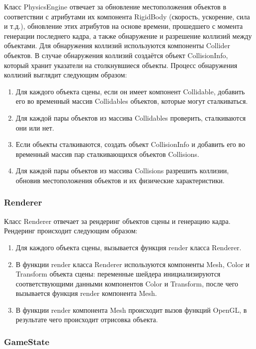 Класс PhysicsEngine отвечает за обновление местоположения объектов в соответствии с атрибутами их компонента RigidBody (скорость, ускорение, сила и т.д.), обновление этих атрибутов на основе времени, прошедшего с момента генерации последнего кадра, а также обнаружение и разрешение коллизий между объектами.
Для обнаружения коллизий используются компоненты Collider объектов.
В случае обнаружения коллизий создаётся объект CollisionInfo, который хранит указатели на столкнувшиеся объекты.
Процесс обнаружения коллизий выглядит следующим образом:
\begin{enumerate}
    \item Для каждого объекта сцены, если он имеет компонент Collidable, добавить его во временный массив Collidables объектов, которые могут сталкиваться.
    \item Для каждой пары объектов из массива Collidables проверить, сталкиваются они или нет.
    \item Если объекты сталкиваются, создать объект CollisionInfo и добавить его во временный массив пар сталкивающихся объектов Collisions.
    \item Для каждой пары объектов из массива Collisions разрешить коллизии, обновив местоположения объектов и их физические характеристики.
\end{enumerate}

\subsubsection*{Renderer}

Класс Renderer отвечает за рендеринг объектов сцены и генерацию кадра.
Рендеринг происходит следующим образом:
\begin{enumerate}
    \item Для каждого объекта сцены, вызывается функция render класса Renderer.
    \item В функции render класса Renderer используются компоненты Mesh, Color и Transform объекта сцены: переменные шейдера инициализируются соответствующими данными компонентов Color и Transform, после чего вызывается функция render компонента Mesh.
    \item В функции render компонента Mesh происходит вызов функций OpenGL, в результате чего происходит отрисовка объекта.
\end{enumerate}

\subsubsection*{GameState}

